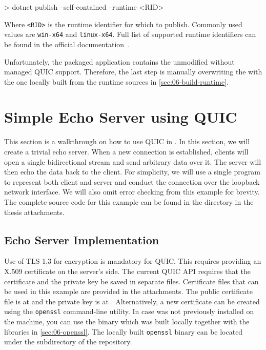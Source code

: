 \begin{myVerbatim}
> dotnet publish --self-contained --runtime <RID>
\end{myVerbatim}

Where \texttt{<RID>} is the runtime identifier for which to publish. Commonly used values are
\texttt{win-x64} and \texttt{linux-x64}. Full list of supported runtime identifiers can be found in
the official \dotnet{} documentation~\cite{dotnetRIDs}.

Unfortunately, the packaged application contains the unmodified \SystemNetQuicDll{} without managed
QUIC support. Therefore, the last step is manually overwriting the \SystemNetQuicDll{} with the one
locally built from the \dotnet{} runtime sources in \autoref{sec:06-build-runtime}.

\section{Simple Echo Server using QUIC}\label{sec:06tutorial}

This section is a walkthrough on how to use QUIC in \dotnet{}. In this section, we will create a
trivial echo server. When a new connection is established, clients will open a single bidirectional
stream and send arbitrary data over it. The server will then echo the data back to the client. For
simplicity, we will use a single \dotnet{} program to represent both client and server and conduct
the connection over the loopback network interface. We will also omit error checking from this
example for brevity. The complete source code for this example can be found in the
 directory in the thesis attachments.

\subsection{Echo Server Implementation}

Use of TLS 1.3 for encryption is mandatory for QUIC\@. This requires providing an X.509 certificate
on the server's side. The current QUIC API requires that the certificate and the private key be
saved in separate files. Certificate files that can be used in this example are provided in the
attachments. The public certificate file is at  and the private key is at
. Alternatively, a new certificate can be created using the
\texttt{openssl} command-line utility. In case \libopenssl{} was not previously installed on the
machine, you can use the binary which was built locally together with the libraries in
\autoref{sec:06-openssl}. The locally built \texttt{openssl} binary can be located under the
 subdirectory of the \libopenssl{} repository.

